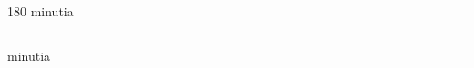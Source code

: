 
\begin{frame}
\begin{center}
\begin{turn}{180}
{\fontsize{2.5cm}{1em}\selectfont minutia}
\end{turn}
\vspace{1em}\par  
\hrule
\vspace{1em}\par  
{\fontsize{2.5cm}{1em}\selectfont minutia}
\end{center}
\end{frame}
